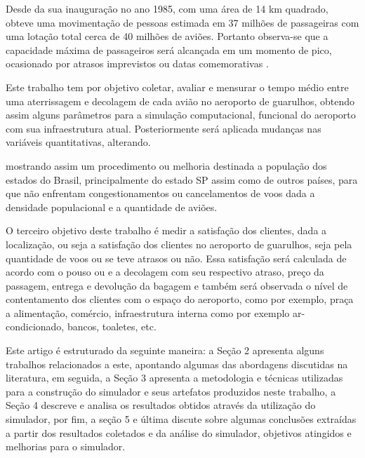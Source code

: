 \documentclass[12pt]{article}
\begin{document}
  Desde da sua inauguração no ano 1985, com uma área de 14 km quadrado,
  obteve uma movimentação de pessoas estimada em  37 milhões de passageiras
  com uma lotação total cerca de 40 milhões de aviões. Portanto observa-se
  que a capacidade máxima de passageiros será alcançada em um momento de
  pico, ocasionado por atrasos imprevistos ou datas comemorativas
  \cite{Moser:07}.
  



Este trabalho tem por objetivo coletar, avaliar e mensurar o tempo médio
entre uma aterrissagem e  decolagem de cada avião no aeroporto de guarulhos, obtendo assim alguns parâmetros para a simulação computacional, funcional do aeroporto com sua infraestrutura atual.
Posteriormente será  aplicada mudanças nas variáveis quantitativas, 
alterando.

mostrando assim um procedimento ou melhoria destinada  a população dos
estados do Brasil, principalmente do estado SP assim como de outros países,
para que não enfrentam congestionamentos ou cancelamentos de voos dada a 
densidade populacional e a quantidade de aviões.

O terceiro objetivo deste trabalho é medir a satisfação dos clientes, dada
a localização, ou seja a satisfação dos clientes no aeroporto de guarulhos, seja pela quantidade de voos ou se teve atrasos ou não.
Essa satisfação será calculada de acordo com o pouso ou e a decolagem com 
seu respectivo atraso, preço da passagem, entrega e devolução da bagagem
e também será observada o nível de contentamento dos clientes com o espaço
do aeroporto, como por exemplo, praça a alimentação, comércio, 
infraestrutura interna como por exemplo ar-condicionado, bancos, toaletes,
etc.


Este artigo é estruturado da seguinte maneira: a Seção 2 apresenta alguns trabalhos
relacionados a este, apontando algumas das abordagens discutidas na literatura,
em seguida, a Seção 3 apresenta a metodologia e técnicas utilizadas para a construção 
do simulador e seus artefatos produzidos neste trabalho, a Seção 4 descreve e analisa 
os resultados obtidos através da utilização do simulador, por fim, a seção 5 e última 
discute sobre algumas conclusões extraídas a partir dos resultados coletados e da 
análise do simulador, objetivos atingidos e melhorias para o simulador.
  
\end{document}
